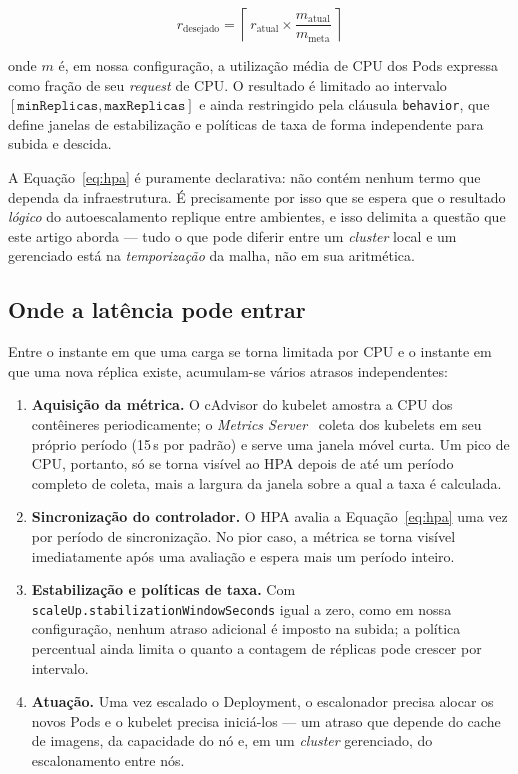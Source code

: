\documentclass[conference]{IEEEtran}
\begin{document}
\begin{equation}
\label{eq:hpa}
r_{\text{desejado}} = \left\lceil\, r_{\text{atual}} \times
\frac{m_{\text{atual}}}{m_{\text{meta}}} \,\right\rceil
\end{equation}

\noindent onde $m$ é, em nossa configuração, a utilização média de CPU dos Pods
expressa como fração de seu \emph{request} de CPU. O resultado é limitado ao
intervalo $[\texttt{minReplicas}, \texttt{maxReplicas}]$ e ainda restringido pela
cláusula \texttt{behavior}, que define janelas de estabilização e políticas de
taxa de forma independente para subida e descida.

A Equação~\eqref{eq:hpa} é puramente declarativa: não contém nenhum termo que
dependa da infraestrutura. É precisamente por isso que se espera que o resultado
\emph{lógico} do autoescalamento replique entre ambientes, e isso delimita a
questão que este artigo aborda --- tudo o que pode diferir entre um
\emph{cluster} local e um gerenciado está na \emph{temporização} da malha, não em
sua aritmética.

\subsection{Onde a latência pode entrar}
\label{sec:latencia}

Entre o instante em que uma carga se torna limitada por CPU e o instante em que
uma nova réplica existe, acumulam-se vários atrasos independentes:

\begin{enumerate}
\item \textbf{Aquisição da métrica.} O cAdvisor do kubelet amostra a CPU dos
contêineres periodicamente; o \emph{Metrics Server}~\cite{metricsserver} coleta
dos kubelets em seu próprio período (15\,s por padrão) e serve uma janela móvel
curta. Um pico de CPU, portanto, só se torna visível ao HPA depois de até um
período completo de coleta, mais a largura da janela sobre a qual a taxa é
calculada.
\item \textbf{Sincronização do controlador.} O HPA avalia a
Equação~\eqref{eq:hpa} uma vez por período de sincronização. No pior caso, a
métrica se torna visível imediatamente após uma avaliação e espera mais um
período inteiro.
\item \textbf{Estabilização e políticas de taxa.} Com
\texttt{scaleUp.stabilizationWindowSeconds} igual a zero, como em nossa
configuração, nenhum atraso adicional é imposto na subida; a política percentual
ainda limita o quanto a contagem de réplicas pode crescer por intervalo.
\item \textbf{Atuação.} Uma vez escalado o Deployment, o escalonador precisa
alocar os novos Pods e o kubelet precisa iniciá-los --- um atraso que depende do
cache de imagens, da capacidade do nó e, em um \emph{cluster} gerenciado, do
escalonamento entre nós.
\end{enumerate}
\end{document}
